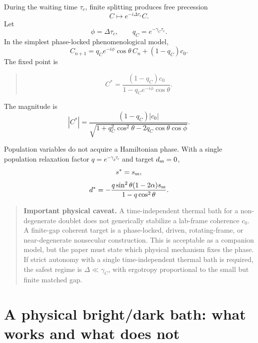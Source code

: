 \documentclass[11pt,a4paper]{article}
\newenvironment{resultbox}{\begin{quote}\small}{\end{quote}}
\newenvironment{notebox}{\begin{quote}\small}{\end{quote}}
\begin{document}
During the waiting time $\tau_c$, finite splitting produces free precession
\begin{equation}
C\mapsto e^{-i\Delta\tau_c}C.
\end{equation}
Let
\begin{equation}
\phi=\Delta\tau_c,
\qquad
q_C=e^{-\gamma_C\tau_c}.
\end{equation}
In the simplest phase-locked phenomenological model,
\begin{equation}
C_{n+1}=q_C e^{-i\phi}\cos\theta\, C_n+(1-q_C)c_0.
\end{equation}
The fixed point is
\begin{resultbox}
\begin{equation}
C^*=\frac{(1-q_C)c_0}{1-q_C e^{-i\phi}\cos\theta}.
\end{equation}
\end{resultbox}
The magnitude is
\begin{equation}
|C^*|=\frac{(1-q_C)|c_0|}{\sqrt{1+q_C^2\cos^2\theta-2q_C\cos\theta\cos\phi}}.
\end{equation}

Population variables do not acquire a Hamiltonian phase. With a single population relaxation factor $q=e^{-\gamma_d\tau_c}$ and target $d_{\rm ss}=0$,
\begin{equation}
s^*=s_{\rm ss},
\end{equation}
\begin{equation}
d^*=-\frac{q\sin^2\theta(1-2\alpha)s_{\rm ss}}{1-q\cos^2\theta}.
\end{equation}

\begin{notebox}
\textbf{Important physical caveat.} A time-independent thermal bath for a non-degenerate doublet does not generically stabilize a lab-frame coherence $c_0$. A finite-gap coherent target is a phase-locked, driven, rotating-frame, or near-degenerate nonsecular construction. This is acceptable as a companion model, but the paper must state which physical mechanism fixes the phase. If strict autonomy with a single time-independent thermal bath is required, the safest regime is $\Delta\ll\gamma_C$, with ergotropy proportional to the small but finite matched gap.
\end{notebox}

\section{A physical bright/dark bath: what works and what does not}
\end{document}
